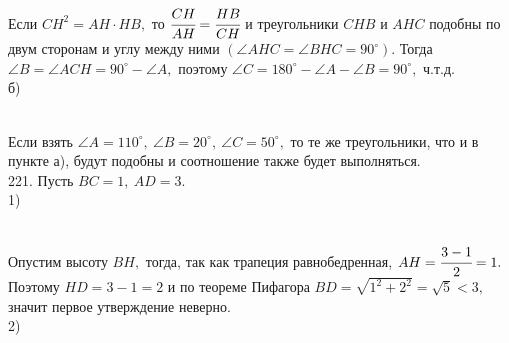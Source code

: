 \documentclass[12pt]{article}
\begin{document}
Если $CH^2=AH\cdot HB,$ то $\cfrac{CH}{AH}=\cfrac{HB}{CH}$ и треугольники $CHB$ и $AHC$ подобны по двум сторонам и углу между ними $(\angle AHC=\angle BHC=90^\circ).$ Тогда $\angle B=\angle ACH=90^\circ-\angle A,$ поэтому $\angle C=180^\circ-\angle A-\angle B=90^\circ,$ ч.т.д.\\
б) \begin{figure}[ht!]
\end{figure}\\
Если взять $\angle A=110^\circ,\ \angle B=20^\circ,\ \angle C=50^\circ,$ то те же треугольники, что и в пункте а), будут подобны и соотношение также будет выполняться.\\
221. Пусть $BC=1,\ AD=3.$\\
1) \begin{figure}[ht!]
\end{figure}\\
Опустим высоту $BH,$ тогда, так как трапеция равнобедренная, $AH=\cfrac{3-1}{2}=1.$ Поэтому $HD=3-1=2$ и по теореме Пифагора $BD=\sqrt{1^2+2^2}=\sqrt{5}<3,$ значит первое утверждение неверно.\\
2) \begin{figure}[ht!]
\end{figure}\\
\end{document}
